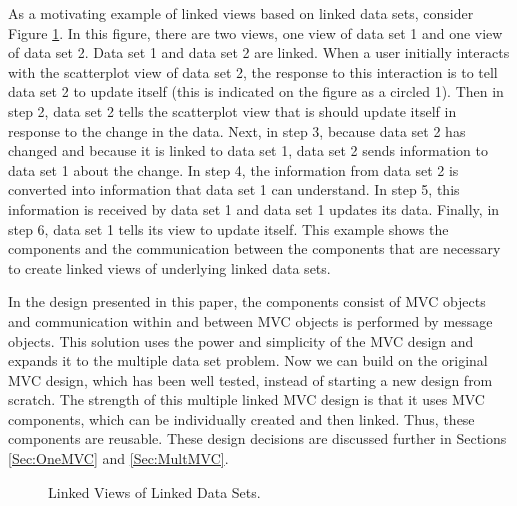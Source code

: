 \documentclass{article}[11pt]
\begin{document}
As a motivating example of linked views based on linked data sets, consider
Figure \ref{Fig:firstMP}.  In this figure, there are two views, one view of
data set 1 and one view of data set 2.  Data set 1 and data set 2 are linked.
When a user initially interacts with the scatterplot view of data set 2, the
response to this interaction is to tell data set 2 to update itself (this is
indicated on the figure as a circled 1).  Then in step 2, data set 2 tells the
scatterplot view that is should update itself in response to the change in the
data.  Next, in step 3, because data set 2 has changed and because it is
linked to data set 1, data set 2 sends information to data set 1 about the
change.  In step 4, the information from data set 2 is converted into
information that data set 1 can understand.  In step 5, this information is
received by data set 1 and data set 1 updates its data.  Finally, in step 6,
data set 1 tells its view to update itself.  This example shows the components
and the communication between the components that are necessary to create
linked views of underlying linked data sets.  

In the design presented in this paper, the components consist of MVC objects
and communication within and between MVC objects is performed by message
objects.  This solution uses the power and simplicity of the MVC design and
expands it to the multiple data set problem.  Now we can build on the original
MVC design, which has been well tested, instead of starting a new design from
scratch.  The strength of this multiple linked MVC design is that it uses MVC
components, which can be individually created and then linked.  Thus, these
components are reusable.  These design decisions are discussed further in
Sections \ref{Sec:OneMVC} and \ref{Sec:MultMVC}. 


\begin{figure}[ht]
  \begin{center}
    \caption{ Linked Views of Linked Data Sets. }
    \label{Fig:firstMP}
  \end{center}
\end{figure}
\end{document}
